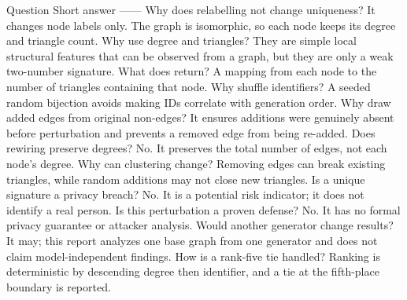 {}\markdownRendererPipe{} Question \markdownRendererPipe{} Short answer \markdownRendererPipe{}\markdownRendererSoftLineBreak
{}\markdownRendererPipe{}---\markdownRendererPipe{}---\markdownRendererPipe{}\markdownRendererSoftLineBreak
{}\markdownRendererPipe{} Why does relabelling not change uniqueness? \markdownRendererPipe{} It changes node labels only. The graph is isomorphic, so each node keeps its degree and triangle count. \markdownRendererPipe{}\markdownRendererSoftLineBreak
{}\markdownRendererPipe{} Why use degree and triangles? \markdownRendererPipe{} They are simple local structural features that can be observed from a graph, but they are only a weak two-number signature. \markdownRendererPipe{}\markdownRendererSoftLineBreak
{}\markdownRendererPipe{} What does  return? \markdownRendererPipe{} A mapping from each node to the number of triangles containing that node. \markdownRendererPipe{}\markdownRendererSoftLineBreak
{}\markdownRendererPipe{} Why shuffle identifiers? \markdownRendererPipe{} A seeded random bijection avoids making IDs correlate with generation order. \markdownRendererPipe{}\markdownRendererSoftLineBreak
{}\markdownRendererPipe{} Why draw added edges from original non-edges? \markdownRendererPipe{} It ensures additions were genuinely absent before perturbation and prevents a removed edge from being re-added. \markdownRendererPipe{}\markdownRendererSoftLineBreak
{}\markdownRendererPipe{} Does rewiring preserve degrees? \markdownRendererPipe{} No. It preserves the total number of edges, not each node's degree. \markdownRendererPipe{}\markdownRendererSoftLineBreak
{}\markdownRendererPipe{} Why can clustering change? \markdownRendererPipe{} Removing edges can break existing triangles, while random additions may not close new triangles. \markdownRendererPipe{}\markdownRendererSoftLineBreak
{}\markdownRendererPipe{} Is a unique signature a privacy breach? \markdownRendererPipe{} No. It is a potential risk indicator; it does not identify a real person. \markdownRendererPipe{}\markdownRendererSoftLineBreak
{}\markdownRendererPipe{} Is this perturbation a proven defense? \markdownRendererPipe{} No. It has no formal privacy guarantee or attacker analysis. \markdownRendererPipe{}\markdownRendererSoftLineBreak
{}\markdownRendererPipe{} Would another generator change results? \markdownRendererPipe{} It may; this report analyzes one base graph from one generator and does not claim model-independent findings. \markdownRendererPipe{}\markdownRendererSoftLineBreak
{}\markdownRendererPipe{} How is a rank-five tie handled? \markdownRendererPipe{} Ranking is deterministic by descending degree then identifier, and a tie at the fifth-place boundary is reported. \markdownRendererPipe{}\markdownRendererSoftLineBreak
